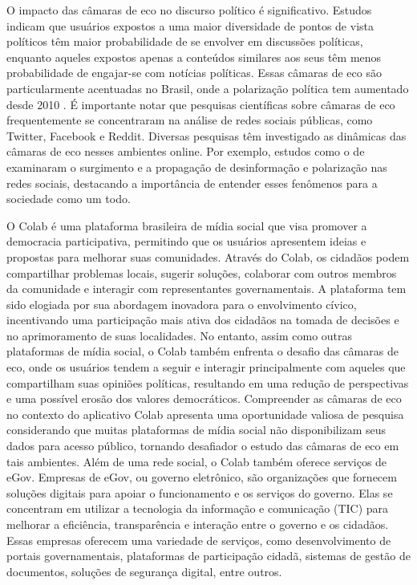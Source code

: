O impacto das câmaras de eco no discurso político é significativo. Estudos indicam que usuários expostos a uma maior diversidade de pontos de vista políticos têm maior probabilidade de se envolver em discussões políticas, enquanto aqueles expostos apenas a conteúdos similares aos seus têm menos probabilidade de engajar-se com notícias políticas. Essas câmaras de eco são particularmente acentuadas no Brasil, onde a polarização política tem aumentado desde 2010 \cite{2022_Ortellado}. É importante notar que pesquisas científicas sobre câmaras de eco frequentemente se concentraram na análise de redes sociais públicas, como Twitter, Facebook e Reddit. Diversas pesquisas têm investigado as dinâmicas das câmaras de eco nesses ambientes online. Por exemplo, estudos como o de \cite[p. 224]{2016_Vicario} examinaram o surgimento e a propagação de desinformação e polarização nas redes sociais, destacando a importância de entender esses fenômenos para a sociedade como um todo.

O Colab é uma plataforma brasileira de mídia social que visa promover a democracia participativa, permitindo que os usuários apresentem ideias e propostas para melhorar suas comunidades. Através do Colab, os cidadãos podem compartilhar problemas locais, sugerir soluções, colaborar com outros membros da comunidade e interagir com representantes governamentais. A plataforma tem sido elogiada por sua abordagem inovadora para o envolvimento cívico, incentivando uma participação mais ativa dos cidadãos na tomada de decisões e no aprimoramento de suas localidades. No entanto, assim como outras plataformas de mídia social, o Colab também enfrenta o desafio das câmaras de eco, onde os usuários tendem a seguir e interagir principalmente com aqueles que compartilham suas opiniões políticas, resultando em uma redução de perspectivas e uma possível erosão dos valores democráticos. Compreender as câmaras de eco no contexto do aplicativo Colab apresenta uma oportunidade valiosa de pesquisa considerando que muitas plataformas de mídia social não disponibilizam seus dados para acesso público, tornando desafiador o estudo das câmaras de eco em tais ambientes. Além de uma rede social, o Colab também oferece serviços de eGov. Empresas de eGov, ou governo eletrônico, são organizações que fornecem soluções digitais para apoiar o funcionamento e os serviços do governo. Elas se concentram em utilizar a tecnologia da informação e comunicação (TIC) para melhorar a eficiência, transparência e interação entre o governo e os cidadãos. Essas empresas oferecem uma variedade de serviços, como desenvolvimento de portais governamentais, plataformas de participação cidadã, sistemas de gestão de documentos, soluções de segurança digital, entre outros.

